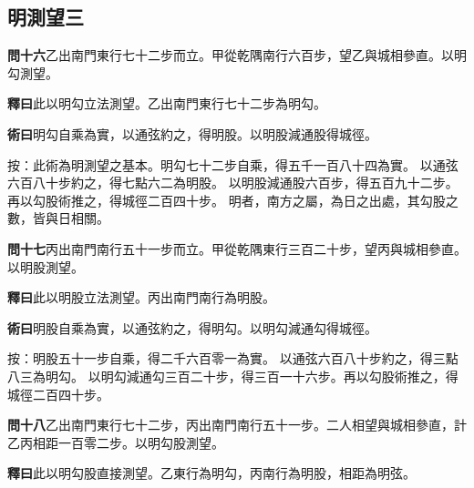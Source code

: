 \documentclass[12pt,a4paper]{article}
\newcommand{\Section}[1]{\subsection*{#1}}
\begin{document}
\Section{明測望三}

\noindent\textbf{問十六}\quad 乙出南門東行七十二步而立。甲從乾隅南行六百步，望乙與城相參直。以明勾測望。

\vspace{0.3em}

\noindent\textbf{釋曰}\quad 此以明勾立法測望。乙出南門東行七十二步為明勾。

\vspace{0.3em}

\noindent\textbf{術曰}\quad 明勾自乘為實，以通弦約之，得明股。以明股減通股得城徑。

\vspace{0.3em}

\noindent
按：此術為明測望之基本。明勾七十二步自乘，得五千一百八十四為實。
以通弦六百八十步約之，得七點六二為明股。
以明股減通股六百步，得五百九十二步。再以勾股術推之，得城徑二百四十步。
明者，南方之屬，為日之出處，其勾股之數，皆與日相關。

\vspace{0.5em}

\noindent\textbf{問十七}\quad 丙出南門南行五十一步而立。甲從乾隅東行三百二十步，望丙與城相參直。以明股測望。

\vspace{0.3em}

\noindent\textbf{釋曰}\quad 此以明股立法測望。丙出南門南行為明股。

\vspace{0.3em}

\noindent\textbf{術曰}\quad 明股自乘為實，以通弦約之，得明勾。以明勾減通勾得城徑。

\vspace{0.3em}

\noindent
按：明股五十一步自乘，得二千六百零一為實。
以通弦六百八十步約之，得三點八三為明勾。
以明勾減通勾三百二十步，得三百一十六步。再以勾股術推之，得城徑二百四十步。

\vspace{0.5em}

\noindent\textbf{問十八}\quad 乙出南門東行七十二步，丙出南門南行五十一步。二人相望與城相參直，計乙丙相距一百零二步。以明勾股測望。

\vspace{0.3em}

\noindent\textbf{釋曰}\quad 此以明勾股直接測望。乙東行為明勾，丙南行為明股，相距為明弦。
\end{document}
